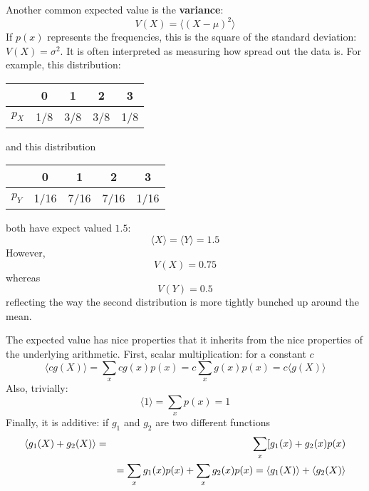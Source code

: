 \documentclass[11pt,a4paper]{scrartcl}
\begin{document}
Another common expected value is the \textbf{variance}:
\begin{equation}
V(X)=\langle (X-\mu)^2\rangle
\end{equation}
If $p(x)$ represents the frequencies, this is the square of the
standard deviation: $V(X)=\sigma^2$. It is often interpreted as measuring how spread out the data is. For example, this distribution:
\begin{center}
\begin{tabular}{c|cccc}
&0&1&2&3\\
\hline
$p_X$&1/8&3/8&3/8&1/8
\end{tabular}
\end{center}
and this distribution
\begin{center}
\begin{tabular}{c|cccc}
&0&1&2&3\\
\hline
$p_Y$&1/16&7/16&7/16&1/16
\end{tabular}
\end{center}
both have expect valued $1.5$:
\begin{equation}
\langle X\rangle = \langle Y\rangle = 1.5
\end{equation}
However,
\begin{equation}
V(X)=0.75
\end{equation}
whereas 
\begin{equation}
V(Y)=0.5
\end{equation}
reflecting the way the second distribution is more tightly bunched up
around the mean.

The expected value has nice properties that it inherits from the nice
properties of the underlying arithmetic. First, scalar multiplication:
for a constant $c$
\begin{equation}
\langle c g(X)\rangle =\sum_x cg(x)p(x)=c\sum_x g(x)p(x)=c\langle g(X)\rangle
\end{equation}
Also, trivially:
\begin{equation}
\langle 1\rangle=\sum_x p(x)=1
\end{equation}
Finally, it is additive: if $g_1$ and $g_2$ are two different
functions
\begin{eqnarray}
\langle g_1(X)+g_2(X)\rangle &=&\sum_x [g_1(x)+g_2(x)p(x)\cr
&&=\sum_x g_1(x)p(x)+\sum_x g_2(x)p(x)=\langle g_1(X)\rangle+\langle g_2(X)\rangle
\end{eqnarray}
\end{document}
